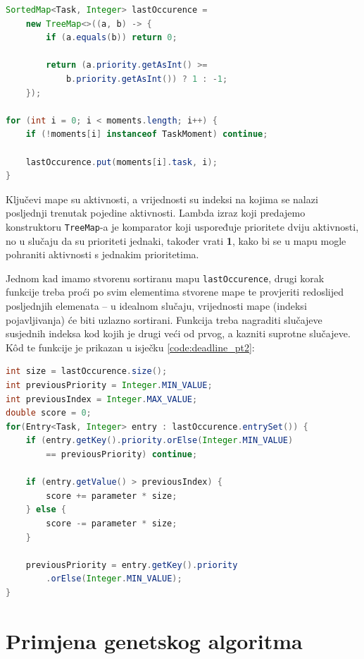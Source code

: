 \documentclass[times, utf8, zavrsni]{fer}
\begin{document}
\begin{lstlisting}[language=java, caption=Određivanje posljednjeg trenutka aktivnosti, label={code:deadline_occurence}, mathescape]
SortedMap<Task, Integer> lastOccurence =
    new TreeMap<>((a, b) -> {
        if (a.equals(b)) return 0;
        
        return (a.priority.getAsInt() >=
            b.priority.getAsInt()) ? 1 : -1;
    });

for (int i = 0; i < moments.length; i++) {
    if (!moments[i] instanceof TaskMoment) continue;
    
    lastOccurence.put(moments[i].task, i);
}
\end{lstlisting}
Ključevi mape su aktivnosti, a vrijednosti su indeksi na kojima se nalazi posljednji trenutak pojedine aktivnosti. Lambda izraz koji predajemo konstruktoru \texttt{TreeMap}-a je komparator koji uspoređuje prioritete dviju aktivnosti, no u slučaju da su prioriteti jednaki, također vrati \textbf{1}, kako bi se u mapu mogle pohraniti aktivnosti s jednakim prioritetima.

Jednom kad imamo stvorenu sortiranu mapu \texttt{lastOccurence}, drugi korak funkcije treba proći po svim elementima stvorene mape te provjeriti redoslijed posljednjih elemenata -- u idealnom slučaju, vrijednosti mape (indeksi pojavljivanja) će biti uzlazno sortirani. Funkcija treba nagraditi slučajeve susjednih indeksa kod kojih je drugi veći od prvog, a kazniti suprotne slučajeve. K\^{o}d te funkcije je prikazan u isječku \ref{code:deadline_pt2}:

\begin{lstlisting}[language=java, caption=Provjera redoslijeda aktivnosti, label={code:deadline_pt2}, mathescape]
int size = lastOccurence.size();
int previousPriority = Integer.MIN_VALUE;
int previousIndex = Integer.MAX_VALUE;
double score = 0;
for(Entry<Task, Integer> entry : lastOccurence.entrySet()) {
    if (entry.getKey().priority.orElse(Integer.MIN_VALUE)
        == previousPriority) continue;
        
    if (entry.getValue() > previousIndex) {
        score += parameter * size;
    } else {
        score -= parameter * size;
    }
    
    previousPriority = entry.getKey().priority
        .orElse(Integer.MIN_VALUE);
}
\end{lstlisting}

\chapter{Primjena genetskog algoritma}\label{primjena genetskog algoritma}
\end{document}
